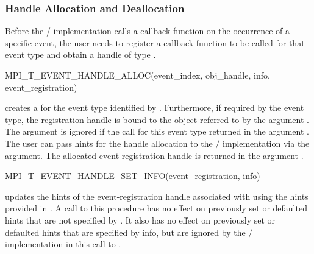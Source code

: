 \subsubsection{Handle Allocation and Deallocation}
\label{sec:tools:mpit:eventalloc}

Before the \MPI/ implementation calls a callback function on the occurrence of
a specific event, the user needs to register a callback function to be called for
that event type and obtain a handle of type
.

\begin{funcdef}{MPI\_T\_EVENT\_HANDLE\_ALLOC}{(\mbox{event\_index}, \mbox{obj\_handle}, \mbox{info}, \mbox{event\_registration})}
\end{funcdef}

 creates a 
for the event type identified by . Furthermore,
if required by the event type, the registration handle is bound to the
object referred to by the argument .  The argument
 is ignored if the 
call for this event type returned  in the
argument .  The user can pass hints for the handle
allocation to the \MPI/ implementation via the  argument.  The
allocated event-registration handle is returned in the argument
.

\begin{funcdef}{MPI\_T\_EVENT\_HANDLE\_SET\_INFO}{(\mbox{event\_registration}, \mbox{info})}
\end{funcdef}

 updates the hints of the
event-registration handle associated with  using the
hints provided in . A call to this procedure has no effect on previously
set or defaulted hints that are not specified by . It also has
no effect on previously set or defaulted hints that are specified by info,
but are ignored by the \MPI/ implementation in this call to
.


